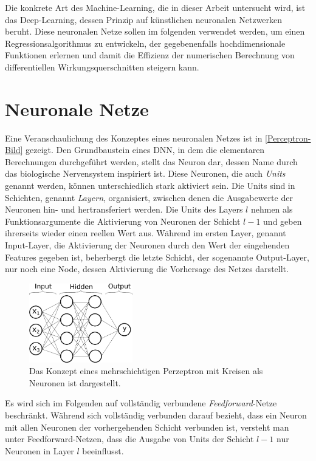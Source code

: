 Die konkrete Art des Machine-Learning, die in dieser Arbeit untersucht wird, ist das Deep-Learning, dessen Prinzip auf künstlichen neuronalen Netzwerken beruht. Diese neuronalen Netze sollen im folgenden verwendet werden, um einen Regressionsalgorithmus zu entwickeln, der gegebenenfalls hochdimensionale Funktionen erlernen und damit die Effizienz der numerischen Berechnung von differentiellen Wirkungsquerschnitten steigern kann. 
\section{Neuronale Netze}
Eine Veranschaulichung des Konzeptes eines neuronalen Netzes ist in \textsf{\autoref{Perceptron-Bild}} gezeigt.
Den Grundbaustein eines DNN, in dem die elementaren Berechnungen durchgeführt werden, stellt das Neuron dar, dessen Name durch das biologische Nervensystem inspiriert ist.
Diese Neuronen, die auch \textit{Units} genannt werden, können unterschiedlich stark aktiviert sein. Die Units sind in Schichten, genannt \textit{Layern}, organisiert, zwischen denen die Ausgabewerte der Neuronen hin- und hertransferiert werden. Die Units des Layers $l$ nehmen als Funktionsargumente die Aktivierung von Neuronen der Schicht $l-1$ und geben ihrerseits wieder einen reellen Wert aus. Während im ersten Layer, genannt Input-Layer, die Aktivierung der Neuronen durch den Wert der eingehenden Features gegeben ist, beherbergt die letzte Schicht, der sogenannte Output-Layer, nur noch eine Node, dessen Aktivierung die Vorhersage des Netzes darstellt. 

\begin{figure}
	\includegraphics[width=0.4\textwidth]{graphics/NeuralNetwork}
	\caption{Das Konzept eines mehrschichtigen Perzeptron \cite{Perceptron} mit Kreisen als Neuronen ist dargestellt.}
	
	\label{Perceptron-Bild}
\end{figure}
Es wird sich im Folgenden auf vollständig verbundene \textit{Feedforward}-Netze beschränkt. Während sich vollständig verbunden darauf bezieht, dass ein Neuron mit allen Neuronen der vorhergehenden Schicht verbunden ist, versteht man unter Feedforward-Netzen, dass die Ausgabe von Units der Schicht $l-1$ nur Neuronen in Layer $l$ beeinflusst.

